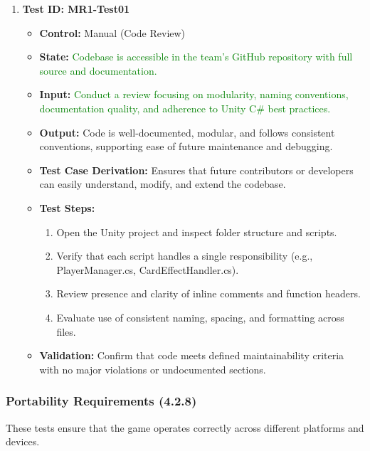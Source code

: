 \documentclass[12pt]{article}
\newcommand{\added}[1]{\textcolor{green}{#1}}
\begin{document}
\begin{enumerate}
    \item \textbf{Test ID: MR1-Test01}
    \begin{itemize}
        \item \textbf{Control:} Manual (Code Review)
        \item \textbf{State:} \added{Codebase is accessible in the team’s GitHub repository with full source and documentation.}
        \item \textbf{Input:} \added{Conduct a review focusing on modularity, naming conventions, documentation quality, and adherence to Unity C\# best practices.}
        \item \textbf{Output:} Code is well-documented, modular, and follows consistent conventions, supporting ease of future maintenance and debugging.
        \item \textbf{Test Case Derivation:} Ensures that future contributors or developers can easily understand, modify, and extend the codebase.
        \item \textbf{Test Steps:}
        \begin{enumerate}
            \item Open the Unity project and inspect folder structure and scripts.
            \item Verify that each script handles a single responsibility (e.g., PlayerManager.cs, CardEffectHandler.cs).
            \item Review presence and clarity of inline comments and function headers.
            \item Evaluate use of consistent naming, spacing, and formatting across files.
        \end{enumerate}
        \item \textbf{Validation:} Confirm that code meets defined maintainability criteria with no major violations or undocumented sections.
    \end{itemize}
\end{enumerate}

\subsubsection{Portability Requirements (4.2.8)}

These tests ensure that the game operates correctly across different platforms and devices.
\end{document}
